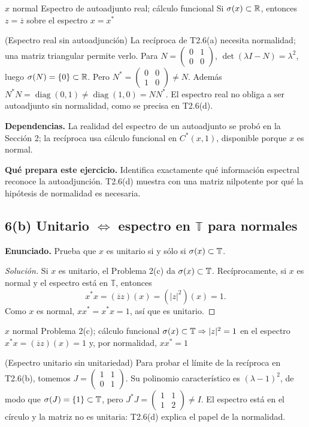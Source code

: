 \proofdiagram
{$x$ normal}
{Espectro de autoadjunto real; cálculo funcional}
{Si $\sigma(x)\subset\mathbb R$, entonces $z=\overline z$ sobre el espectro}
{$x=x^*$}

\begin{cthejemplo}{(Espectro real sin autoadjunción)}
La recíproca de T2.6(a) necesita normalidad; una matriz triangular permite verlo.
Para $N=\begin{pmatrix}0&1\\0&0\end{pmatrix}$,
$\det(\lambda I-N)=\lambda^2$, luego $\sigma(N)=\{0\}\subset\mathbb R$.
Pero $N^*=\begin{pmatrix}0&0\\1&0\end{pmatrix}\ne N$.
Además $N^*N=\operatorname{diag}(0,1)\ne\operatorname{diag}(1,0)=NN^*$.
El espectro real no obliga a ser autoadjunto sin normalidad, como se precisa en T2.6(d).
\end{cthejemplo}

\noindent\textbf{Dependencias.} La realidad del espectro de un autoadjunto se probó en la Sección 2; la recíproca usa cálculo funcional en $C^*(x,1)$, disponible porque $x$ es normal.

\noindent\textbf{Qué prepara este ejercicio.} Identifica exactamente qué información espectral reconoce la autoadjunción. T2.6(d) muestra con una matriz nilpotente por qué la hipótesis de normalidad es necesaria.

\subsection*{6(b) Unitario $\Longleftrightarrow$ espectro en $\mathbb T$ para normales}

\noindent\textbf{Enunciado.} Prueba que $x$ es unitario si y sólo si $\sigma(x)\subset\mathbb T$.

\begin{proof}[Solución]
Si $x$ es unitario, el Problema 2(c) da $\sigma(x)\subset\mathbb T$. Recíprocamente, si $x$ es
normal y el espectro está en $\mathbb T$, entonces
\[
 x^*x=(\overline z z)(x)=(|z|^2)(x)=1.
\]
Como $x$ es normal, $xx^*=x^*x=1$, así que es unitario.
\end{proof}

\proofdiagram
{$x$ normal}
{Problema 2(c); cálculo funcional}
{$\sigma(x)\subset\mathbb T\Rightarrow |z|^2=1$ en el espectro}
{$x^*x=(\overline z z)(x)=1$ y, por normalidad, $xx^*=1$}

\begin{cthejemplo}{(Espectro unitario sin unitariedad)}
Para probar el límite de la recíproca en T2.6(b), tomemos
$J=\begin{pmatrix}1&1\\0&1\end{pmatrix}$.
Su polinomio característico es $(\lambda-1)^2$, de modo que
$\sigma(J)=\{1\}\subset\mathbb T$, pero
$J^*J=\begin{pmatrix}1&1\\1&2\end{pmatrix}\ne I$.
El espectro está en el círculo y la matriz no es unitaria: T2.6(d) explica el papel de la normalidad.
\end{cthejemplo}

